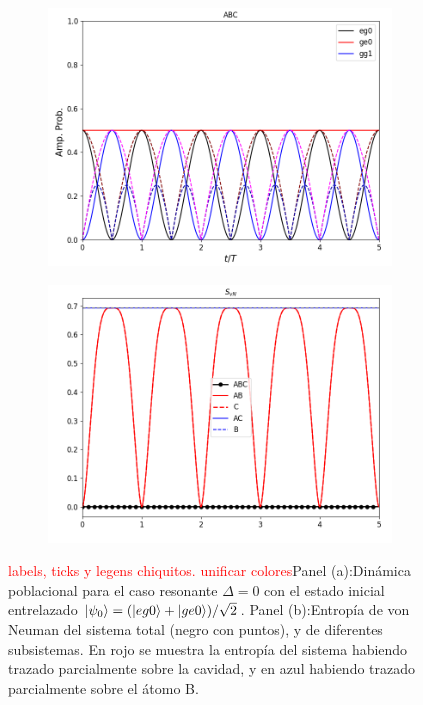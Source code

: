 \begin{figure}[h]
    \centering
    \begin{subfigure}{0.49\textwidth}
        \centering
        \includegraphics[width=\textwidth]{figuras/ch4/d eg0+ din ABC d=0.png}
        \caption{}
        \label{fig4:dinamica pob eg0 sim resonante}
    \end{subfigure}
    \hfill
    \begin{subfigure}{0.49\textwidth}
        \centering
        \includegraphics[width=\textwidth]{figuras/ch4/d eg0+ din svn d=0.png}
        \caption{}
        \label{fig4:dinamica svn eg0 sim resonante}
    \end{subfigure}
    \caption{\textcolor{red}{labels, ticks y legens chiquitos. unificar colores}Panel (a):Dinámica poblacional para el caso resonante $\Delta=0$ con el estado inicial entrelazado $\ket{\psi_0}=(\ket{eg0} + \ket{ge0})/\sqrt{2}$. Panel (b):Entropía de von Neuman del sistema total (negro con puntos), y de diferentes subsistemas. En rojo se muestra la entropía del sistema habiendo trazado parcialmente sobre la cavidad, y en azul habiendo trazado parcialmente sobre el átomo B.}
    \label{fig4:dinamica eg0 sim resonante}
\end{figure}

